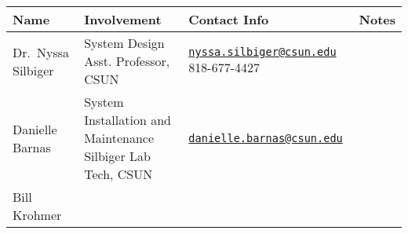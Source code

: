 \documentclass[]{book}
\begin{document}
\begin{longtable}[]{@{}llll@{}}
\toprule
\begin{minipage}[b]{0.06\columnwidth}\raggedright\strut
Name\strut
\end{minipage} & \begin{minipage}[b]{0.06\columnwidth}\raggedright\strut
Involvement\strut
\end{minipage} & \begin{minipage}[b]{0.06\columnwidth}\raggedright\strut
Contact Info\strut
\end{minipage} & \begin{minipage}[b]{0.06\columnwidth}\raggedright\strut
Notes\strut
\end{minipage}\tabularnewline
\midrule
\endhead
\begin{minipage}[t]{0.06\columnwidth}\raggedright\strut
Dr.~Nyssa Silbiger\strut
\end{minipage} & \begin{minipage}[t]{0.06\columnwidth}\raggedright\strut
System Design Asst. Professor, CSUN\strut
\end{minipage} & \begin{minipage}[t]{0.06\columnwidth}\raggedright\strut
\href{mailto:nyssa.silbiger@csun.edu}{\nolinkurl{nyssa.silbiger@csun.edu}}
818-677-4427\strut
\end{minipage} & \begin{minipage}[t]{0.06\columnwidth}\raggedright\strut
\strut
\end{minipage}\tabularnewline
\begin{minipage}[t]{0.06\columnwidth}\raggedright\strut
Danielle Barnas\strut
\end{minipage} & \begin{minipage}[t]{0.06\columnwidth}\raggedright\strut
System Installation and Maintenance Silbiger Lab Tech, CSUN\strut
\end{minipage} & \begin{minipage}[t]{0.06\columnwidth}\raggedright\strut
\href{mailto:danielle.barnas@csun.edu}{\nolinkurl{danielle.barnas@csun.edu}}\strut
\end{minipage} & \begin{minipage}[t]{0.06\columnwidth}\raggedright\strut
\strut
\end{minipage}\tabularnewline
\begin{minipage}[t]{0.06\columnwidth}\raggedright\strut
Bill Krohmer\strut
\end{minipage} & \begin{minipage}[t]{0.06\columnwidth}\raggedright\strut

\end{minipage}
\end{longtable}
\end{document}
